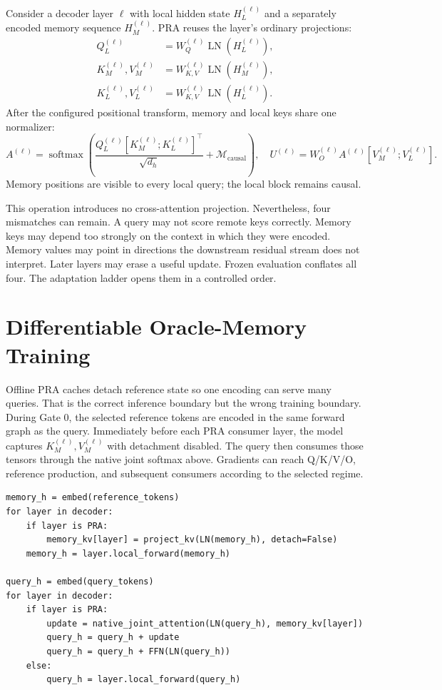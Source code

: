 \documentclass[11pt]{article}
\begin{document}
Consider a decoder layer $\ell$ with local hidden state $H_L^{(\ell)}$ and a
separately encoded memory sequence $H_M^{(\ell)}$. PRA reuses the layer's ordinary
projections:
\begin{align}
Q_L^{(\ell)} &= W_Q^{(\ell)}\operatorname{LN}(H_L^{(\ell)}),\\
K_M^{(\ell)},V_M^{(\ell)}
 &= W_{K,V}^{(\ell)}\operatorname{LN}(H_M^{(\ell)}),\\
K_L^{(\ell)},V_L^{(\ell)}
 &= W_{K,V}^{(\ell)}\operatorname{LN}(H_L^{(\ell)}).
\end{align}
After the configured positional transform, memory and local keys share one
normalizer:
\begin{equation}
A^{(\ell)} = \operatorname{softmax}\!\left(
\frac{Q_L^{(\ell)}[K_M^{(\ell)};K_L^{(\ell)}]^\top}{\sqrt{d_h}}
+ \mathcal{M}_{\mathrm{causal}}
\right),
\quad
U^{(\ell)} = W_O^{(\ell)}A^{(\ell)}[V_M^{(\ell)};V_L^{(\ell)}].
\end{equation}
Memory positions are visible to every local query; the local block remains causal.

This operation introduces no cross-attention projection. Nevertheless, four
mismatches can remain. A query may not score remote keys correctly. Memory keys
may depend too strongly on the context in which they were encoded. Memory values
may point in directions the downstream residual stream does not interpret. Later
layers may erase a useful update. Frozen evaluation conflates all four. The
adaptation ladder opens them in a controlled order.

\section{Differentiable Oracle-Memory Training}

Offline PRA caches detach reference state so one encoding can serve many queries.
That is the correct inference boundary but the wrong training boundary. During
Gate 0, the selected reference tokens are encoded in the same forward graph as the
query. Immediately before each PRA consumer layer, the model captures
$K_M^{(\ell)},V_M^{(\ell)}$ with detachment disabled. The query then consumes those
tensors through the native joint softmax above. Gradients can reach Q/K/V/O,
reference production, and subsequent consumers according to the selected regime.

\begin{verbatim}
memory_h = embed(reference_tokens)
for layer in decoder:
    if layer is PRA:
        memory_kv[layer] = project_kv(LN(memory_h), detach=False)
    memory_h = layer.local_forward(memory_h)

query_h = embed(query_tokens)
for layer in decoder:
    if layer is PRA:
        update = native_joint_attention(LN(query_h), memory_kv[layer])
        query_h = query_h + update
        query_h = query_h + FFN(LN(query_h))
    else:
        query_h = layer.local_forward(query_h)
\end{verbatim}
\end{document}
